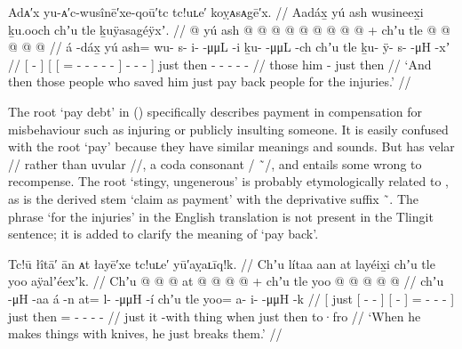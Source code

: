 \ex\label{ex:106-25-pay-for-injuries}%
%
\begingl
	\glpreamble	Adᴀ′x yu-ᴀ′c-wusînē′xe-qoū′tc tc!uʟe′ koỵᴀsᴀgē′x. //
	\glpreamble	Aadáx̱ yú ash wusineex̱i ḵu.ooch chʼu tle ḵuÿasagéÿxʼ. //
	\gla	{}  @ {} {}
		{} yú {} ash @  @ {} @ {} @ {} @ {} @ {} {}  @ {} @ {} @ {} {} +
		chʼu tle  @ {} @ {} @ {} @ {} @ {} //
	\glb	{} á -dáx̱ {}
		{} yú {} ash= wu- s- i-  -μμL -i {} ḵu-  -μμL -ch {}
		chʼu tle ḵu- ÿ- s-  -μH -xʼ //
	\glc	{}[  - {}]
		{}[  {}[ = - - -  - - {}]
			-  - - {}]
		just then - - -  - - //
	\gld	{}  {} {}
		{} those {} him  {} {} {} {} {} {}  {} {} - {}
		just then  {} {} {} {} {} //
	\glft	‘And then those people who saved him just pay back people for the injuries.’
		//
\endgl
\xe

The root  ‘pay debt’ \parencites[f05/72–74]{leer:1973}[655]{leer:1976} in (\lastx) specifically describes payment in compensation for misbehaviour such as injuring or publicly insulting someone.
It is easily confused with the root  ‘pay’ \parencites[f05/65–66]{leer:1973}[868]{leer:1976} because they have similar meanings and sounds.
But  has velar  // rather than uvular  //, a coda consonant  / \~\ /, and entails some wrong to recompense.
The root  ‘stingy, ungenerous’ \parencites[f05/69–70]{leer:1973}[654]{leer:1976} is probably etymologically related to , as is the derived stem  ‘claim as payment’ with the deprivative suffix  \~\ .
The phrase ‘for the injuries’ in the English translation is not present in the Tlingit sentence; it is added to clarify the meaning of ‘pay back’.

\ex\label{ex:106-26-knife-break}%
%
\begingl
	\glpreamble	Tc!ū łîtā′ ān ᴀt łayē′xe tc!uʟe′ yū′aỵaʟīq!k. //
	\glpreamble	Chʼu lítaa aan at layéix̱i chʼu tle yoo aÿalʼéexʼk. //
	\gla	{} Chʼu {}  @ {} @ {} {} {}  @ {} {}
			at @  @ {} @ {} @ {} {} +
		chʼu tle yoo @  @ {} @ {} @ {} @ {} //
	\glb	{} chʼu {}  -μH -aa {} {} á -n {}
			at= l-  -μμH -í {} 
		chʼu tle yoo= a- i-  -μμH -k //
	\glc	{}[ just {}[  - - {}] {}[  - {}]
			= -  - - {}]
		just then = - -  - - //
	\gld	{} just {}  {} {} {} {} it -with {}
			thing  {} {} \·when {}
		just then to·fro  {} {} {} {} //
	\glft	‘When he makes things with knives, he just breaks them.’
		//
\endgl
\xe

